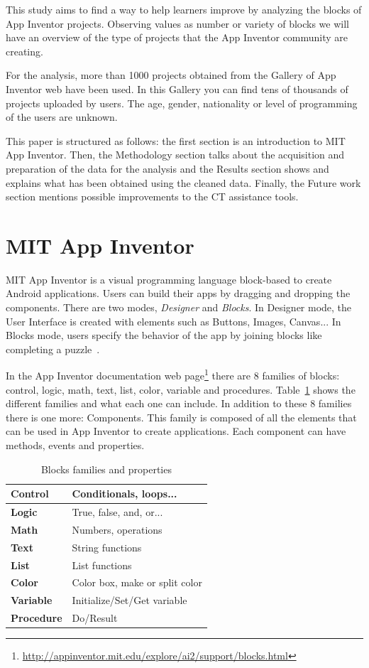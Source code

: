 \documentclass[a4paper]{article}
\begin{document}
This study aims to find a way to help learners improve by analyzing the blocks of App Inventor projects. Observing values as number or variety of blocks we will have an overview of the type of projects that the App Inventor community are creating.

For the analysis, more than 1000 projects obtained from the Gallery of App Inventor web have been used. 
In this Gallery you can find tens of thousands of projects uploaded by users. The age, gender, nationality or level of programming of the users are unknown.

This paper is structured as follows: the first section is an introduction to MIT App Inventor. Then, the Methodology section talks about the acquisition and preparation of the data for the analysis and the Results section shows and explains what has been obtained using the cleaned data. Finally, the Future work section mentions possible improvements to the CT assistance tools.

\section{MIT App Inventor}
MIT App Inventor is a visual programming language block-based to create Android applications. Users can build their apps by dragging and dropping the components. There are two modes, \emph{Designer} and \emph{Blocks}. In Designer mode, the User Interface is created with elements such as Buttons, Images, Canvas... In Blocks mode, users specify the behavior of the app by joining blocks like completing a puzzle~\cite{wolber2011app}.

In the App Inventor documentation web page\footnote{\url{http://appinventor.mit.edu/explore/ai2/support/blocks.html}} there are 8 families of blocks: control, logic, math, text, list, color, variable and procedures. Table~\ref{tab:block-fam} shows the different families and what each one can include. In addition to these 8 families there is one more: Components. This family is composed of all the elements that can be used in App Inventor to create applications. Each component can have methods, events and properties.

\begin{table}
\begin{center}
\caption{Blocks families and properties}
\bigskip
\label{tab:block-fam}
\begin{tabular}{|l|l|}
\hline
\textbf{Control} & Conditionals, loops... \\ \hline
\textbf{Logic} & True, false, and, or... \\ \hline
\textbf{Math} & Numbers, operations\\ \hline
\textbf{Text} & String functions\\ \hline
\textbf{List} & List functions\\ \hline
\textbf{Color} & Color box, make or split color \\ \hline
\textbf{Variable} & Initialize/Set/Get variable\\ \hline
\textbf{Procedure} & Do/Result\\ \hline
\end{tabular}
\end{center}
\end{table}
\end{document}
